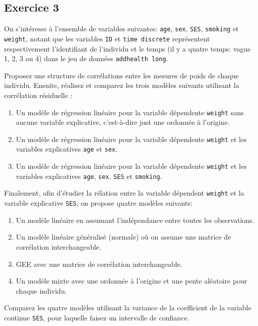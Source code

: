 \documentclass[../main.tex]{subfiles}
\begin{document}
\begin{CJK*}{UTF8}{gbsn}
\section*{Exercice 3}
On s’intéresse à l’ensemble de variables suivantes: \texttt{age}, \texttt{sex}, \texttt{SES}, \texttt{smoking} et
\texttt{weight}, notant que les variables \texttt{ID} et \texttt{time discrete} représentent respectivement l’identifiant
de l’individu et le temps (il y a quatre temps: vague 1, 2, 3 ou 4) dans le jeu de données \texttt{addhealth long}.

Proposez une structure de corrélations entre les mesures de poids de chaque individu.
Ensuite, réalisez et comparez les trois modèles suivants utilisant la corrélation résiduelle :

\begin{enumerate}
    \item Un modèle de régression linéaire pour la variable dépendente \texttt{weight} sans aucune variable explicative,
    c'est-à-dire just une ordonnée à l'origine.
    \item Un modèle de régression linéaire pour la variable dépendente \texttt{weight} et les variables explicatives
    \texttt{age} et \texttt{sex}.
    \item Un modèle de régression linéaire pour la variable dépendente \texttt{weight} et les variables explicatives
    \texttt{age}, \texttt{sex}, \texttt{SES} et \texttt{smoking}.
\end{enumerate}

Finalement, afin d'étudier la rélation entre la variable dépendent \texttt{weight} et la variable explicative \texttt{SES},
on propose quatre modèles suivants:

\begin{enumerate}
    \item Un modèle linéaire en assumant l'indépendance entre toutes les observations.
    \item Un modèle linéaire généralisé (normale) où on assume une matrice de corrélation interchangeable.
    \item GEE avec une matrice de corrélation interchangeable.
    \item Un modèle mixte avec une ordonnée à l'origine et une pente aléatoire pour chaque individu.
\end{enumerate}

Comparez les quatre modèles utilisant la variance de la coefficient de la variable continue \texttt{SES},
pour laquelle faisez un intervalle de confiance.


\end{CJK*}
\end{document}
